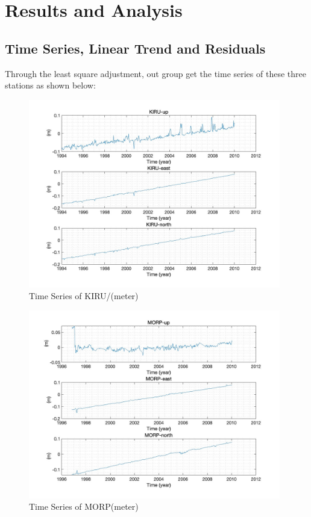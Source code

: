 \documentclass{article}
\begin{document}
\section{Results and Analysis}
\subsection{Time Series, Linear Trend and Residuals}
Through the least square adjustment, out group get the time series of these three stations as shown below:
\begin{figure}[htbp]
  \centering
  \includegraphics[width=11cm]{../result/re_figure/fig_kiru/5.jpg}
  \captionsetup{skip=0.2cm}
  \caption{Time Series of KIRU/(meter)}
  \label{fig:Ori_KIRU}
\end{figure}
\begin{figure}[htbp]
  \centering
  \includegraphics[width=11cm]{../result/re_figure/fig_MORP/5.jpg}
  \caption{Time Series of MORP(meter)}
  \label{fig:Ori_MORP}
\end{figure}
\end{document}
